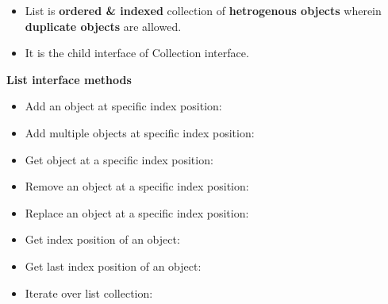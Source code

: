 \setlength{\columnsep}{3pt}
\begin{flushleft}
		
		\begin{itemize}
			\item List is \textbf{ordered \& indexed} collection of \textbf{hetrogenous objects} wherein \textbf{duplicate objects} are allowed.
			\item It is the child interface of Collection interface.
		\end{itemize}
	
	\textbf{List interface methods}
	\begin{itemize}
		\item Add an object at specific index position:
		\newpage
		\item Add multiple objects at specific index position:
		\bigskip
		\item Get object at a specific index position:
		\bigskip
		\item Remove an object at a specific index position:
		\bigskip
		\item Replace an object at a specific index position:
		\bigskip
		\item Get index position of an object:
		\bigskip
		\item Get last index position of an object:
		\bigskip
		\item Iterate over list collection:
	\end{itemize}
	
\end{flushleft}


\newpage
